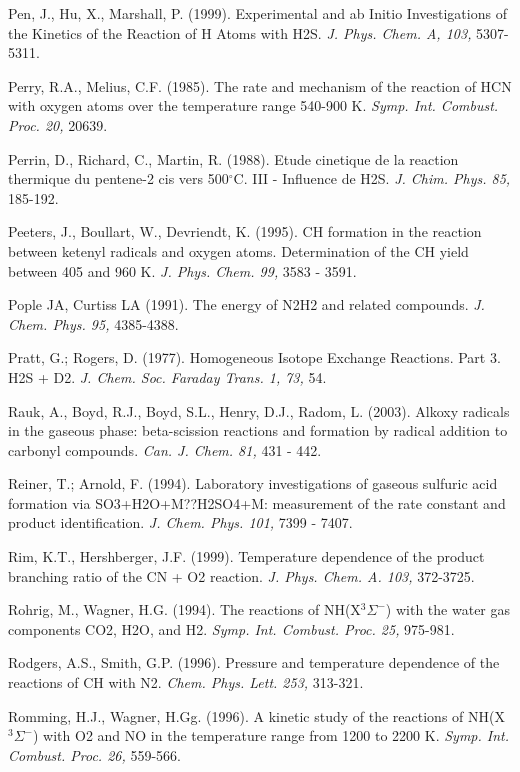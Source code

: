 \documentclass[12pt,landscape]{article}
\newcounter{reaction}
\begin{document}
Pen, J., Hu, X., Marshall, P. (1999).  Experimental and ab Initio Investigations of the Kinetics of the Reaction of H Atoms with H2S.  {\em J. Phys. Chem. A, 103,} 5307-5311.

Perry, R.A., Melius, C.F. (1985).  The rate and mechanism of the reaction of HCN with oxygen atoms over the temperature range 540-900 K.  {\em Symp. Int. Combust. Proc. 20,} 20639.

Perrin, D., Richard, C., Martin, R. (1988). Etude cinetique de la reaction thermique du pentene-2 cis vers 500$^{\circ}$C. III - Influence de H2S. {\em  J. Chim. Phys. 85,} 185-192.

Peeters, J., Boullart, W., Devriendt, K. (1995).  CH formation in the reaction between ketenyl radicals and oxygen atoms. Determination of the CH yield between 405 and 960 K.  {\em J. Phys. Chem. 99,} 3583 - 3591.

Pople JA, Curtiss LA (1991). The energy of N2H2 and related compounds.  {\em J. Chem. Phys. 95,} 4385-4388.

Pratt, G.; Rogers, D. (1977). Homogeneous Isotope Exchange Reactions. Part 3. H2S + D2.  {\em J. Chem. Soc. Faraday Trans. 1, 73,} 54.

Rauk, A., Boyd, R.J., Boyd, S.L., Henry, D.J., Radom, L. (2003).  Alkoxy radicals in the gaseous phase: beta-scission reactions and formation by radical addition to carbonyl compounds.  {\em Can. J. Chem. 81,} 431 - 442.

Reiner, T.; Arnold, F. (1994).  Laboratory investigations of gaseous sulfuric acid formation via SO3+H2O+M??H2SO4+M: measurement of the rate constant and product identification. {\em J. Chem. Phys. 101,} 7399 - 7407.

Rim, K.T., Hershberger, J.F. (1999).  Temperature dependence of the product branching ratio of the CN + O2 reaction. {\em J. Phys. Chem. A. 103,}  372-3725.

Rohrig, M., Wagner, H.G. (1994). The reactions of NH(X$^3\Sigma^-$) with the water gas components CO2, H2O, and H2.  {\em Symp. Int. Combust. Proc.  25,} 975-981.

Rodgers, A.S., Smith, G.P. (1996). Pressure and temperature dependence of the reactions of CH with N2. {\em Chem. Phys. Lett. 253,} 313-321.

Romming, H.J., Wagner, H.Gg. (1996). A kinetic study of the reactions of NH(X$^3\Sigma^-$) with O2 and NO in the temperature range from 1200 to 2200 K.  {\em Symp. Int. Combust. Proc. 26,} 559-566.
\end{document}
